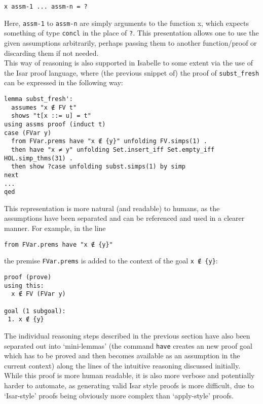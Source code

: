 \documentclass[a4paper, 12pt, twoside]{style/ociamthesis}
\let\OldTexttt\texttt
\renewcommand{\texttt}[1]{\small\OldTexttt{#1}}
\begin{document}
\begin{verbatim}
x assm-1 ... assm-n = ?
\end{verbatim}

Here, \texttt{assm-1} to \texttt{assm-n} are simply arguments to the
function x, which expects something of type \texttt{concl} in the place
of \texttt{?}. This presentation allows one to use the given assumptions
arbitrarily, perhaps passing them to another function/proof or
discarding them if not needed.\\
This way of reasoning is also supported in Isabelle to some extent via
the use of the Isar proof language, where (the previous snippet of) the
proof of \texttt{subst\_fresh} can be expressed in the following way:

\begin{verbatim}
lemma subst_fresh': 
  assumes "x ∉ FV t"
  shows "t[x ::= u] = t"
using assms proof (induct t)
case (FVar y)
  from FVar.prems have "x ∉ {y}" unfolding FV.simps(1) .
  then have "x ≠ y" unfolding Set.insert_iff Set.empty_iff HOL.simp_thms(31) .
  then show ?case unfolding subst.simps(1) by simp
next
...
qed
\end{verbatim}

This representation is more natural (and readable) to humans, as the
assumptions have been separated and can be referenced and used in a
clearer manner. For example, in the line

\begin{verbatim}
from FVar.prems have "x ∉ {y}"
\end{verbatim}

the premise \texttt{FVar.prems} is added to the context of the goal
\texttt{x ∉ \{y\}}:

\begin{verbatim}
proof (prove)
using this:
  x ∉ FV (FVar y)

goal (1 subgoal):
 1. x ∉ {y}
\end{verbatim}

The individual reasoning steps described in the previous section have
also been separated out into `mini-lemmas' (the command \texttt{have}
creates an new proof goal which has to be proved and then becomes
available as an assumption in the current context) along the lines of
the intuitive reasoning discussed initially. While this proof is more
human readable, it is also more verbose and potentially harder to
automate, as generating valid Isar style proofs is more difficult, due
to `Isar-style' proofs being obviously more complex than `apply-style'
proofs.
\end{document}
